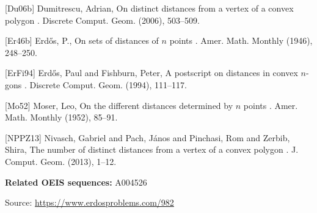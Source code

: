 \documentclass{article}
\begin{document}
[Du06b] Dumitrescu, Adrian, On distinct distances from a vertex of a convex polygon . Discrete Comput. Geom. (2006), 503--509.

[Er46b] Erd\H{o}s, P., On sets of distances of {$n$} points . Amer. Math. Monthly (1946), 248--250.

[ErFi94] Erd\H{o}s, Paul and Fishburn, Peter, A postscript on distances in convex {$n$}-gons . Discrete Comput. Geom. (1994), 111--117.

[Mo52] Moser, Leo, On the different distances determined by {$n$} points . Amer. Math. Monthly (1952), 85--91.

[NPPZ13] Nivasch, Gabriel and Pach, J\'{a}nos and Pinchasi, Rom and Zerbib, Shira, The number of distinct distances from a vertex of a convex polygon . J. Comput. Geom. (2013), 1--12.

\noindent\textbf{Related OEIS sequences:} A004526

\bigskip
\noindent\small{Source: \url{https://www.erdosproblems.com/982}}
\end{document}
